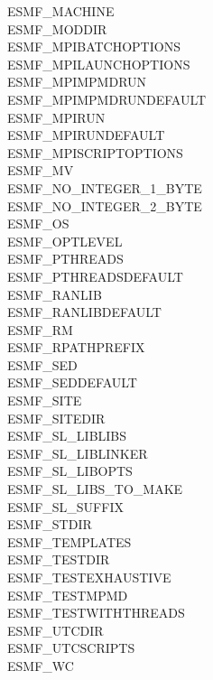 \begin{description}
\item[ESMF\_MACHINE]
\item[ESMF\_MODDIR]
\item[ESMF\_MPIBATCHOPTIONS]
\item[ESMF\_MPILAUNCHOPTIONS]
\item[ESMF\_MPIMPMDRUN]
\item[ESMF\_MPIMPMDRUNDEFAULT]
\item[ESMF\_MPIRUN]
\item[ESMF\_MPIRUNDEFAULT]
\item[ESMF\_MPISCRIPTOPTIONS]
\item[ESMF\_MV]
\item[ESMF\_NO\_INTEGER\_1\_BYTE]
\item[ESMF\_NO\_INTEGER\_2\_BYTE]
\item[ESMF\_OS]
\item[ESMF\_OPTLEVEL]
\item[ESMF\_PTHREADS]
\item[ESMF\_PTHREADSDEFAULT]
\item[ESMF\_RANLIB]
\item[ESMF\_RANLIBDEFAULT]
\item[ESMF\_RM]
\item[ESMF\_RPATHPREFIX]
\item[ESMF\_SED]
\item[ESMF\_SEDDEFAULT]
\item[ESMF\_SITE]
\item[ESMF\_SITEDIR]
\item[ESMF\_SL\_LIBLIBS]
\item[ESMF\_SL\_LIBLINKER]
\item[ESMF\_SL\_LIBOPTS]
\item[ESMF\_SL\_LIBS\_TO\_MAKE]
\item[ESMF\_SL\_SUFFIX]
\item[ESMF\_STDIR]
\item[ESMF\_TEMPLATES]
\item[ESMF\_TESTDIR]
\item[ESMF\_TESTEXHAUSTIVE]
\item[ESMF\_TESTMPMD]
\item[ESMF\_TESTWITHTHREADS]
\item[ESMF\_UTCDIR]
\item[ESMF\_UTCSCRIPTS]
\item[ESMF\_WC]

\end{description}



